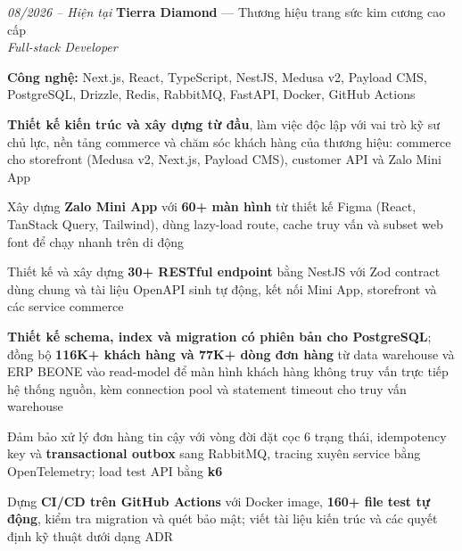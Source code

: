 \begin{twocolentry}{\textit{08/2026 -- Hiện tại}}
    \textbf{Tierra Diamond} --- Thương hiệu trang sức kim cương cao cấp \\[4pt]
    \textit{Full-stack Developer}
\end{twocolentry}
\begin{onecolentry}
    \begin{highlights}
        \item \textbf{Công nghệ:} Next.js, React, TypeScript, NestJS, Medusa v2, Payload CMS, PostgreSQL, Drizzle, Redis, RabbitMQ, FastAPI, Docker, GitHub Actions
        \item \textbf{Thiết kế kiến trúc và xây dựng từ đầu}, làm việc độc lập với vai trò kỹ sư chủ lực, nền tảng commerce và chăm sóc khách hàng của thương hiệu: commerce cho storefront (Medusa v2, Next.js, Payload CMS), customer API và Zalo Mini App
        \item Xây dựng \textbf{Zalo Mini App} với \textbf{60+ màn hình} từ thiết kế Figma (React, TanStack Query, Tailwind), dùng lazy-load route, cache truy vấn và subset web font để chạy nhanh trên di động
        \item Thiết kế và xây dựng \textbf{30+ RESTful endpoint} bằng NestJS với Zod contract dùng chung và tài liệu OpenAPI sinh tự động, kết nối Mini App, storefront và các service commerce
        \item \textbf{Thiết kế schema, index và migration có phiên bản cho PostgreSQL}; đồng bộ \textbf{116K+ khách hàng và 77K+ dòng đơn hàng} từ data warehouse và ERP BEONE vào read-model để màn hình khách hàng không truy vấn trực tiếp hệ thống nguồn, kèm connection pool và statement timeout cho truy vấn warehouse
        \item Đảm bảo xử lý đơn hàng tin cậy với vòng đời đặt cọc 6 trạng thái, idempotency key và \textbf{transactional outbox} sang RabbitMQ, tracing xuyên service bằng OpenTelemetry; load test API bằng \textbf{k6}
        \item Dựng \textbf{CI/CD trên GitHub Actions} với Docker image, \textbf{160+ file test tự động}, kiểm tra migration và quét bảo mật; viết tài liệu kiến trúc và các quyết định kỹ thuật dưới dạng ADR
    \end{highlights}
\end{onecolentry}
\vspace{0.2 cm}

